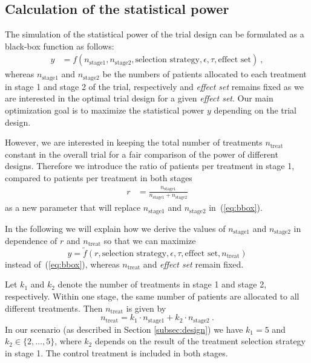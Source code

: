\documentclass[bimj,fleqn]{w-art}
\theoremstyle{plain}
\theoremstyle{definition}
\begin{document}
\subsection{Calculation of the statistical power}

The simulation of the statistical power of the trial design can be formulated as a black-box function as follows:
\begin{align}
  \label{eq:bbox}
  y & = f(n_{\text{stage1}}, n_{\text{stage2}}, \text{selection strategy}, \epsilon, \tau, \text{effect set}) \ ,
\end{align}
whereas $n_{\text{stage1}}$ and $n_{\text{stage2}}$ be the numbers of patients allocated to each treatment in stage 1 and stage 2 of the trial, respectively and \emph{effect set} remains fixed as we are interested in the optimal trial design for a given \emph{effect set}.
Our main optimization goal is to maximize the statistical power $y$ depending on the trial design. 

However, we are interested in keeping the total number of treatments $n_{\text{treat}}$ constant in the overall trial for a fair comparison of the power of different designs.
Therefore we introduce the ratio of patients per treatment in stage 1, compared to patients per treatment in both stages
\begin{align}
  \label{eq:r}
 r & = \frac{n_{\text{stage1}}}{n_{\text{stage1}}+n_{\text{stage2}}}
\end{align}
as a new parameter that will replace $n_{\text{stage1}}$ and $n_{\text{stage2}}$ in~(\ref{eq:bbox}). 

In the following we will explain how we derive the values of $n_{\text{stage1}}$ and $n_{\text{stage2}}$ in dependence of $r$ and $n_{\text{treat}}$ so that we can maximize
\begin{equation}
  \label{eq:bbox2}
  y = \tilde{f}(r, \text{selection strategy}, \epsilon, \tau, \text{effect set}, n_{\text{treat}})
\end{equation}
instead of~(\ref{eq:bbox}), whereas $n_{\text{treat}}$ and \emph{effect set} remain fixed.

Let $k_1$ and $k_2$ denote the number of treatments in stage 1 and stage 2, respectively. 
Within one stage, the same number of patients are allocated to all different treatments. 
Then $n_{\text{treat}}$ is given by
\begin{equation}
  \label{eq:ntreat}
  n_{\text{treat}} = k_1 \cdot n_{\text{stage1}} + k_2 \cdot n_{\text{stage2}} \ .
\end{equation}
In our scenario (as described in Section \ref{subsec:design}) we have $k_1 = 5$ and $k_2 \in \{2, \ldots, 5\}$, where $k_2$ depends on the result of the treatment selection strategy in stage 1.
The control treatment is included in both stages.
\end{document}
